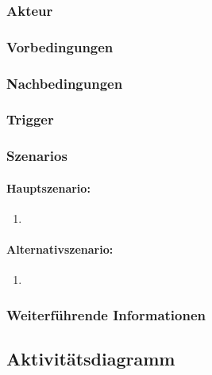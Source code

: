 \subsubsection{Akteur}

\subsubsection{Vorbedingungen}

\subsubsection{Nachbedingungen}

\subsubsection{Trigger}


\subsubsection{Szenarios}
\paragraph{Hauptszenario:}

\begin{enumerate}
	\item 
\end{enumerate}



\paragraph{Alternativszenario:}

\begin{enumerate}
	\item 
\end{enumerate}


\subsubsection{Weiterführende Informationen}


\subsection{Aktivitätsdiagramm}

